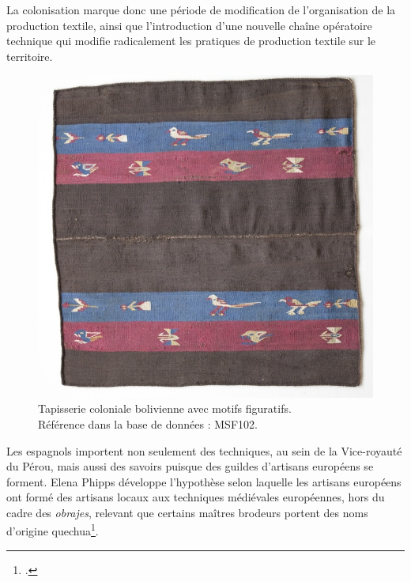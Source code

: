 \noindent La colonisation marque donc une période de modification de l'organisation de la production textile, ainsi que l'introduction d'une nouvelle chaîne opératoire technique qui modifie radicalement les pratiques de production textile sur le territoire.

\begin{figure}[!ht]
       \begin{center}
        		\includegraphics[width=12cm]{../images/MSF102.jpg}
		\caption[Tapisserie coloniale bolivienne avec motifs figuratifs]{Tapisserie coloniale bolivienne avec motifs figuratifs.	\protect\footnotemark \\ Référence dans la base de données : MSF102.}
	\label{fig:MSF102}
	\end{center}
\end{figure}


Les espagnols importent non seulement des techniques, au sein de la Vice-royauté du Pérou, mais aussi des savoirs puisque des guildes d'artisans européens se forment. Elena Phipps développe l'hypothèse selon laquelle les artisans européens ont formé des artisans locaux aux techniques médiévales européennes, hors du cadre des \textit{obrajes}, relevant que certains maîtres brodeurs portent des noms d'origine quechua\footcite[p.~37]{phippsIberianGlobe2013}. 

